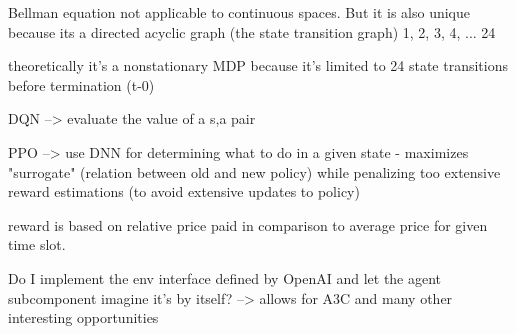 Bellman equation not applicable to continuous spaces. But it is also unique because its a directed acyclic graph (the
state transition graph) 1, 2, 3, 4, ... 24

theoretically it's a nonstationary \ac {MDP} because it's limited to 24 state transitions before termination (t-0)

DQN --> evaluate the value of a s,a pair

\ac {PPO} --> use DNN for determining what to do in a given state - maximizes "surrogate" (relation between old and new
policy) while penalizing too extensive reward estimations (to avoid extensive updates to policy)

reward is based on relative price paid in comparison to average price for given time slot.

Do I implement the env interface defined by OpenAI and let the agent subcomponent imagine it's by itself? --> allows for
A3C and many other interesting opportunities


